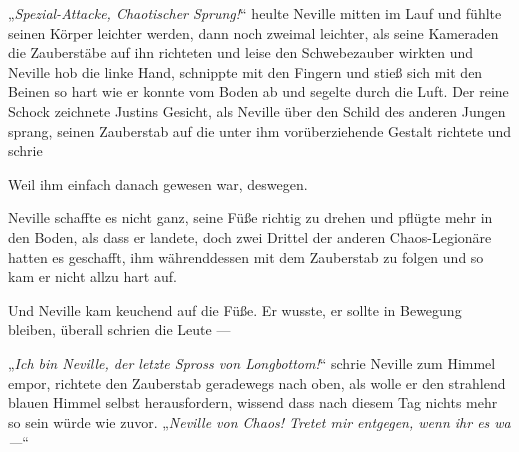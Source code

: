 „\emph{Spezial-Attacke, Chaotischer Sprung!}“ heulte Neville mitten im Lauf und fühlte seinen Körper leichter werden, dann noch zweimal leichter, als seine Kameraden die Zauberstäbe auf ihn richteten und leise den Schwebezauber wirkten und Neville hob die linke Hand, schnippte mit den Fingern und stieß sich mit den Beinen so hart wie er konnte vom Boden ab und segelte durch die Luft. Der reine Schock zeichnete Justins Gesicht, als Neville über den Schild des anderen Jungen sprang, seinen Zauberstab auf die unter ihm vorüberziehende Gestalt richtete und schrie 

Weil ihm einfach danach gewesen war, deswegen.

Neville schaffte es nicht ganz, seine Füße richtig zu drehen und pflügte mehr in den Boden, als dass er landete, doch zwei Drittel der anderen Chaos-Legionäre hatten es geschafft, ihm währenddessen mit dem Zauberstab zu folgen und so kam er nicht allzu hart auf.

Und Neville kam keuchend auf die Füße. Er wusste, er sollte in Bewegung bleiben, überall schrien die Leute —

„\emph{Ich bin Neville, der letzte Spross von Longbottom!}“ schrie Neville zum Himmel empor, richtete den Zauberstab geradewegs nach oben, als wolle er den strahlend blauen Himmel selbst herausfordern, wissend dass nach diesem Tag nichts mehr so sein würde wie zuvor. „\emph{Neville von Chaos! Tretet mir entgegen, wenn ihr es wa—}“


